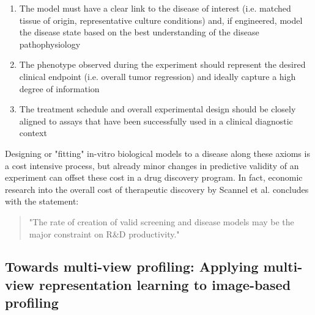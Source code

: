 \begin{flushleft}
\begin{enumerate}
    \item The model must have a clear link to the disease of interest (i.e. matched tissue of origin, representative culture conditions) and, if engineered, model the disease state based on the best understanding of the disease pathophysiology
    \item The phenotype observed during the experiment should represent the desired clinical endpoint (i.e. overall tumor regression) and ideally capture a high degree of information
    \item The treatment schedule and overall experimental design should be closely aligned to assays that have been successfully used in a clinical diagnostic context
\end{enumerate}

Designing or "fitting" in-vitro biological models to a disease along these axioms is a cost intensive process, but already minor changes in predictive validity of an experiment can offset these cost in a drug discovery program. In fact, economic research into the overall cost of therapeutic discovery by Scannel et al. \citep{scannellWhenQualityBeats2016} concludes with the statement:

\begin{quote}
"The rate of creation of valid screening and disease models may be the major constraint on R\&D productivity."
\end{quote}

\subsection{Towards multi-view profiling: Applying multi-view representation learning to image-based profiling}


\end{flushleft}
